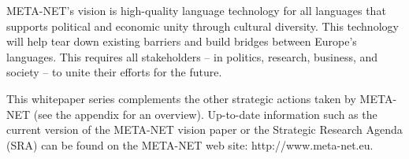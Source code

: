 \documentclass[]{../../metanetpaper}
\begin{document}
\begin{multicols}{2}
META-NET’s vision is high-quality language technology for all languages that supports political and economic unity through cultural diversity. This technology will help tear down existing barriers and build bridges between Europe’s languages. This requires all stakeholders -- in politics, research, business, and society -- to unite their efforts for the future.

This whitepaper series complements the other strategic actions taken by META-NET (see the appendix for an overview). Up-to-date information such as the current version of the META-NET vision paper \cite{Meta1} or the Strategic Research Agenda (SRA) can be found on the META-NET web site: http://www.meta-net.eu.
\end{multicols}

\clearpage


\end{document}
